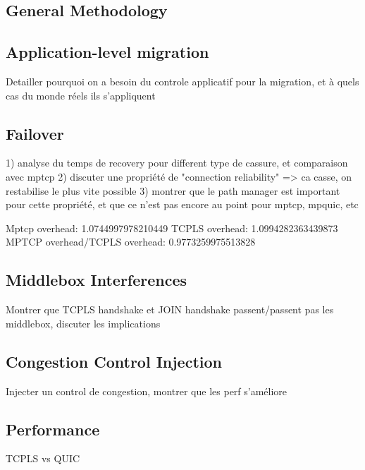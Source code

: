 
\subsection{General Methodology}

\subsection{Application-level migration}

Detailler pourquoi on a besoin du controle applicatif pour la migration, et à
quels cas du monde réels ils s'appliquent

\subsection{Failover}

1) analyse du temps de recovery pour different type de cassure, et comparaison avec mptcp
2) discuter une propriété de "connection reliability" => ca casse, on restabilise le plus vite possible
3) montrer que le path manager est important pour cette propriété, et que ce n'est pas encore au point pour mptcp, mpquic, etc

Mptcp overhead: 1.0744997978210449
TCPLS overhead: 1.0994282363439873
MPTCP overhead/TCPLS overhead:              0.9773259975513828


\subsection{Middlebox Interferences}

Montrer que TCPLS handshake et JOIN handshake passent/passent pas les middlebox,
discuter les implications

\subsection{Congestion Control Injection}

Injecter un control de congestion, montrer que les perf s'améliore

\subsection{Performance}

TCPLS vs QUIC
